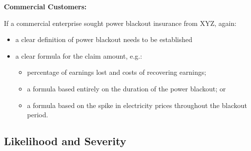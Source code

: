 \documentclass[12pt]{article}
\begin{document}
{\textbf{\large Commercial Customers:}}\par
\begin{flushleft}
If a commercial enterprise sought power blackout insurance from XYZ, again: 
\begin{itemize}
    \item a clear definition of power blackout needs to be established
    \item a clear formula for the claim amount, e.g.:
\begin{itemize}
    \item percentage of earnings lost and costs of recovering earnings;
    \item a formula based entirely on the duration of the power blackout; or
    \item a formula based on the spike in electricity prices throughout the blackout
period.
\end{itemize}
\end{itemize}
\end{flushleft}
\subsection{Likelihood and Severity}
\end{document}
